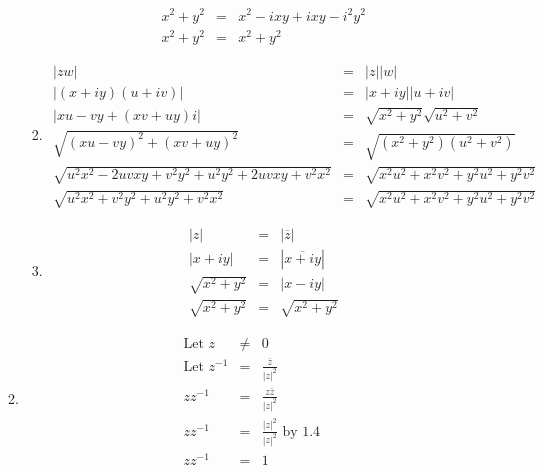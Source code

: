 \documentclass{article}%
\newcommand\abs[1]{\left|#1\right|}
\begin{document}
\begin{enumerate}
\begin{enumerate}[label*=\arabic*.]
\begin{enumerate}[label=\alph*]
\begin{eqnarray*}
            x^2+y^2&=&x^2-ixy+ixy-i^2y^2 \\
            x^2+y^2&=&x^2+y^2
        \end{eqnarray*}
        \item \begin{eqnarray*}
            \abs{zw}&=&\abs{z}\abs{w} \\
            \abs{(x+iy)(u+iv)}&=&\abs{x+iy}\abs{u+iv} \\
            \abs{xu-vy+(xv+uy)i}&=&\sqrt{x^2+y^2}\sqrt{u^2+v^2} \\
            \sqrt{(xu-vy)^2+(xv+uy)^2}&=&\sqrt{(x^2+y^2)(u^2+v^2)} \\
            \sqrt{u^2x^2-2uvxy+v^2y^2+u^2y^2+2uvxy+v^2x^2}&=&\sqrt{x^2u^2+x^2v^2+y^2u^2+y^2v^2} \\
            \sqrt{u^2x^2+v^2y^2+u^2y^2+v^2x^2}&=&\sqrt{x^2u^2+x^2v^2+y^2u^2+y^2v^2}
        \end{eqnarray*}
        \item \begin{eqnarray*}
            \abs{z}&=&\abs{\overline{z}} \\
            \abs{x+iy}&=&\abs{\overline{x+iy}} \\
            \sqrt{x^2+y^2}&=&\abs{x-iy} \\
            \sqrt{x^2+y^2}&=&\sqrt{x^2+y^2}
        \end{eqnarray*}
    \end{enumerate}
    \item 
        \begin{eqnarray*}
            \text{Let } z&\neq&0 \\
            \text{Let } z^{-1}&=&\frac{\overline{z}}{\abs{z}^2} \\
            z z^{-1}&=&\frac{z\overline{z}}{\abs{z}^2} \\
            z z^{-1}&=&\frac{\abs{z}^2}{\abs{z}^2} \text{ by 1.4} \\
            z z^{-1}&=&1
        \end{eqnarray*}
  \end{enumerate}
\end{enumerate}
\end{document}

